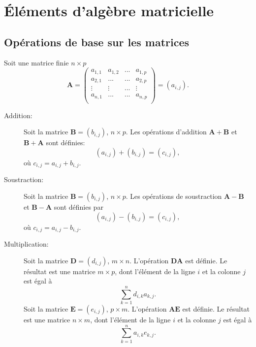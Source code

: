 \chapter{Éléments d'algèbre matricielle}
\label{chap:elements}

\section{Opérations de base sur les matrices}
Soit une matrice finie $n\times p$ $$\mathbf{A}=\begin{pmatrix}a_{1,1} & a_{1,2} &... & a_{1,p} \\ a_{2,1} & ... & ... & a_{2,p}\\ \vdots & \vdots& ... & \vdots\\ a_{n,1} &...&...&a_{n,p}\\ \end{pmatrix}=(a_{i,j}).$$
\begin{description}
\item[Addition:] Soit la matrice $\mathbf{B}=(b_{i,j})$, $n\times p$. Les opérations d'addition $\mathbf{A+B}$ et $\mathbf{B+A}$ sont définies: $$(a_{i,j})+(b_{i,j})=(c_{i,j}),$$ où $c_{i,j}=a_{i,j}+b_{i,j}$.

\item[Soustraction:] Soit la matrice $\mathbf{B}=(b_{i,j})$, $n\times p$. Les opérations de soustraction $\mathbf{A-B}$ et $\mathbf{B-A}$ sont définies par
$$
(a_{i,j})-(b_{i,j})=(c_{i,j}),
$$ 
où $c_{i,j}=a_{i,j}-b_{i,j}$.

\item[Multiplication:] Soit la matrice $\mathbf{D}=(d_{i,j})$, $m\times n$. L'opération $\mathbf{DA}$ est définie. Le résultat est une matrice $m\times p$, dont l'élément de la ligne $i$ et la colonne $j$ est égal à 
$$
\sum_{k=1}^{n}d_{i,k}a_{k,j}.
$$ 
Soit la matrice $\mathbf{E}=(e_{i,j})$, $p\times m$. L'opération $\mathbf{AE}$ est définie. Le résultat est une matrice $n\times m$, dont l'élément de la ligne $i$ et la colonne $j$ est égal à 
$$
\sum_{k=1}^{n}a_{i,k}e_{k,j}.
$$
\end{description}

